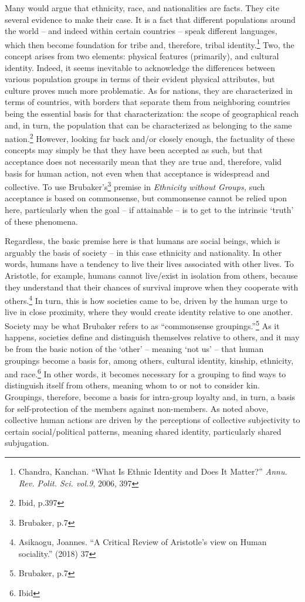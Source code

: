 \documentclass[11pt]{article}
\begin{document}
Many would argue that ethnicity, race, and nationalities are facts. They cite several evidence to make their case. It is a fact that different populations around the world – and indeed within certain countries – speak different languages, which then become foundation for tribe and, therefore, tribal identity.\footnote{Chandra, Kanchan. “What Is Ethnic Identity and Does It Matter?” \textit{Annu. Rev. Polit. Sci. vol.9}, 2006, 397} Two, the concept arises from two elements: physical features (primarily), and cultural identity. Indeed, it seems inevitable to acknowledge the differences between various population groups in terms of their evident physical attributes, but culture proves much more problematic. As for nations, they are characterized in terms of countries, with borders that separate them from neighboring countries being the essential basis for that characterization: the scope of geographical reach and, in turn, the population that can be characterized as belonging to the same nation.\footnote{Ibid, p.397} However, looking far back and/or closely enough, the factuality of these concepts may simply be that they have been accepted as such, but that acceptance does not necessarily mean that they are true and, therefore, valid basis for human action, not even when that acceptance is widespread and collective. To use Brubaker’s\footnote{Brubaker, p.7} premise in \textit{Ethnicity without Groups,} such acceptance is based on commonsense, but commonsense cannot be relied upon here, particularly when the goal – if attainable – is to get to the intrinsic ‘truth’ of these phenomena.

Regardless, the basic premise here is that humans are social beings, which is arguably the basis of society – in this case ethnicity and nationality. In other words, humans have a tendency to live their lives associated with other lives. To Aristotle, for example, humans cannot live/exist in isolation from others, because they understand that their chances of survival improve when they cooperate with others.\footnote{Asikaogu, Joannes. “A Critical Review of Aristotle's view on Human sociality.” (2018) 37} In turn, this is how societies came to be, driven by the human urge to live in close proximity, where they would create identity relative to one another. Society may be what Brubaker refers to as “commonsense groupings.”\footnote{Brubaker, p.7} As it happens, societies define and distinguish themselves relative to others, and it may be from the basic notion of the ‘other’ – meaning ‘not us’ – that human groupings become a basis for, among others, cultural identity, kinship, ethnicity, and race.\footnote{Ibid} In other words, it becomes necessary for a grouping to find ways to distinguish itself from others, meaning whom to or not to consider kin. Groupings, therefore, become a basis for intra-group loyalty and, in turn, a basis for self-protection of the members against non-members. As noted above, collective human actions are driven by the perceptions of collective subjectivity to certain social/political patterns, meaning shared identity, particularly shared subjugation.
\end{document}

